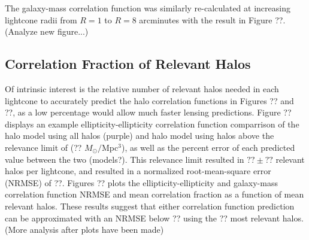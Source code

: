 \documentclass[%
 reprint,
 amsmath,amssymb,
 aps,nofootinbib
]{revtex4-1}
\begin{document}
The galaxy-mass correlation function was similarly re-calculated at increasing lightcone radii from $R=1$ to $R=8$ arcminutes with the result in Figure ??. (Analyze new figure...)

%
%

\subsection{Correlation Fraction of Relevant Halos}

Of intrinsic interest is the relative number of relevant halos needed in each lightcone to accurately predict the halo correlation functions in Figures ?? and ??, as a low percentage would allow much faster lensing predictions. Figure ?? displays an example ellipticity-ellipticity correlation function comparrison of the halo model using all halos (purple) and halo model using halos above the relevance limit of (?? $M_{\odot}/$Mpc$^3$), as well as the percent error of each predicted value between the two (models?). This relevance limit resulted in $??\pm??$ relevant halos per lightcone, and resulted in a normalized root-mean-square error (NRMSE) of ??. Figures ?? plots the ellipticity-ellipticity and galaxy-mass correlation function NRMSE and mean correlation fraction as a function of mean relevant halos. These results suggest that either correlation function prediction can be approximated with an NRMSE below ?? using the ?? most relevant halos. (More analysis after plots have been made)
\end{document}
